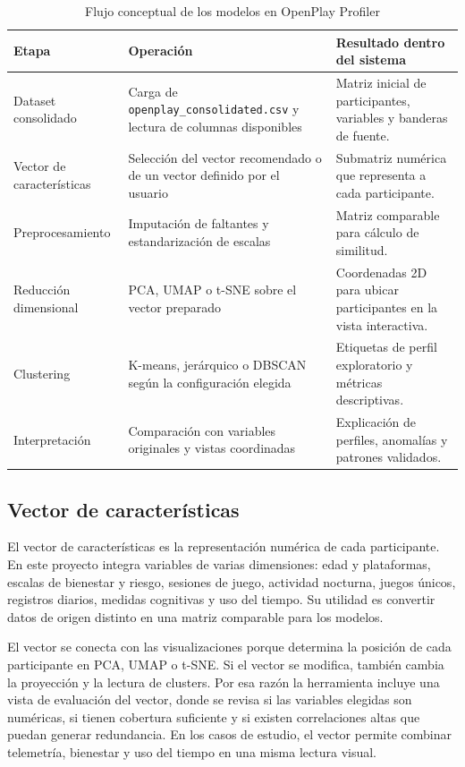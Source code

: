 \documentclass[12pt,a4paper]{article}
\begin{document}
\begin{table}[H]
\centering
\caption{Flujo conceptual de los modelos en OpenPlay Profiler}
\begin{tabularx}{\textwidth}{p{3.2cm} p{4.2cm} X}
\toprule
\textbf{Etapa} & \textbf{Operaci\'on} & \textbf{Resultado dentro del sistema} \\
\midrule
Dataset consolidado & Carga de \texttt{openplay\_consolidated.csv} y lectura de columnas disponibles & Matriz inicial de participantes, variables y banderas de fuente. \\
Vector de caracter\'isticas & Selecci\'on del vector recomendado o de un vector definido por el usuario & Submatriz num\'erica que representa a cada participante. \\
Preprocesamiento & Imputaci\'on de faltantes y estandarizaci\'on de escalas & Matriz comparable para c\'alculo de similitud. \\
Reducci\'on dimensional & PCA, UMAP o t-SNE sobre el vector preparado & Coordenadas 2D para ubicar participantes en la vista interactiva. \\
Clustering & K-means, jer\'arquico o DBSCAN seg\'un la configuraci\'on elegida & Etiquetas de perfil exploratorio y m\'etricas descriptivas. \\
Interpretaci\'on & Comparaci\'on con variables originales y vistas coordinadas & Explicaci\'on de perfiles, anomal\'ias y patrones validados. \\
\bottomrule
\end{tabularx}
\end{table}

\subsection{Vector de caracter\'isticas}

El vector de caracter\'isticas es la representaci\'on num\'erica de cada participante. En este proyecto integra variables de varias dimensiones: edad y plataformas, escalas de bienestar y riesgo, sesiones de juego, actividad nocturna, juegos \'unicos, registros diarios, medidas cognitivas y uso del tiempo. Su utilidad es convertir datos de origen distinto en una matriz comparable para los modelos.

El vector se conecta con las visualizaciones porque determina la posici\'on de cada participante en PCA, UMAP o t-SNE. Si el vector se modifica, tambi\'en cambia la proyecci\'on y la lectura de clusters. Por esa raz\'on la herramienta incluye una vista de evaluaci\'on del vector, donde se revisa si las variables elegidas son num\'ericas, si tienen cobertura suficiente y si existen correlaciones altas que puedan generar redundancia. En los casos de estudio, el vector permite combinar telemetr\'ia, bienestar y uso del tiempo en una misma lectura visual.
\end{document}
